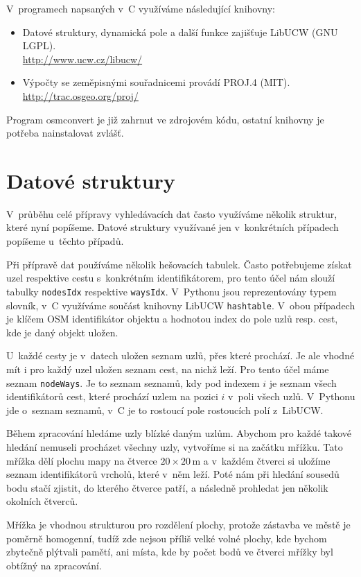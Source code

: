 \noindent V~programech napsaných v~C využíváme následující knihovny:
\begin{itemize}
	\item Datové struktury, dynamická pole a další funkce zajišťuje
	{\tuc LibUCW} (GNU LGPL).\\
	\url{http://www.ucw.cz/libucw/}
	\item Výpočty se zeměpisnými souřadnicemi provádí {\tuc PROJ.4} (MIT).\\
	\url{http://trac.osgeo.org/proj/}
\end{itemize}

Program osmconvert je již zahrnut ve zdrojovém kódu, ostatní knihovny je
potřeba nainstalovat zvlášť.

\section{Datové struktury}
V~průběhu celé přípravy vyhledávacích dat často využíváme několik struktur,
které nyní popíšeme. Datové struktury využívané jen v~konkrétních případech
popíšeme u~těchto případů.

Při přípravě dat používáme několik {\tuc hešovacích tabulek}. Často potřebujeme
získat uzel respektive cestu s~konkrétním identifikátorem, pro tento účel nám
slouží tabulky \verb|nodesIdx| respektive \verb|waysIdx|. V~Pythonu jsou
reprezentovány typem slovník, v~C využíváme součást knihovny LibUCW
\verb|hashtable|. V~obou případech je klíčem OSM identifikátor objektu a
hodnotou index do pole uzlů resp. cest, kde je daný objekt uložen.

U~každé cesty je v~datech uložen seznam uzlů, přes které prochází. Je ale vhodné
mít i pro každý uzel uložen seznam cest, na nichž leží. Pro tento účel
máme seznam \verb|nodeWays|. Je to seznam seznamů, kdy pod indexem $i$ je seznam
všech identifikátorů cest, které prochází uzlem na pozici $i$ v~poli všech uzlů.
V~Pythonu jde o~seznam seznamů, v~C je to rostoucí pole rostoucích polí
z~LibUCW.

Během zpracování hledáme uzly blízké daným uzlům. Abychom pro každé takové
hledání nemuseli procházet všechny uzly, vytvoříme si na začátku {\tuc mřížku}.
Tato mřížka dělí plochu mapy na čtverce $20 \times 20$\,m a v~každém čtverci si
uložíme seznam identifikátorů vrcholů, které v~něm leží. Poté nám při hledání
sousedů bodu stačí zjistit, do kterého čtverce patří, a následně prohledat jen
několik okolních čtverců.

Mřížka je vhodnou strukturou pro rozdělení plochy, protože zástavba ve městě je
poměrně homogenní, tudíž zde nejsou příliš velké volné plochy, kde bychom
zbytečně plýtvali pamětí, ani místa, kde by počet bodů ve čtverci mřížky byl
obtížný na zpracování.

